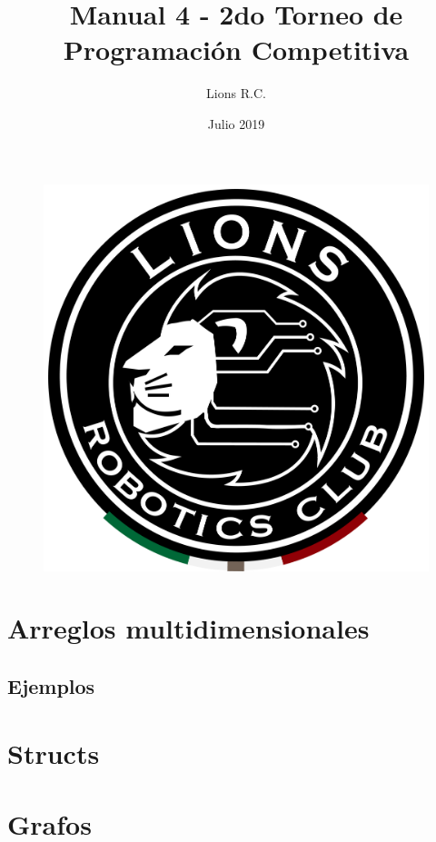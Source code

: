 \documentclass{article}
\title{Manual 4 - 2do Torneo de Programación Competitiva}
\author{Lions R.C.}
\date{Julio 2019}
\begin{document}
\maketitle

\tableofcontents

\begin{figure}[H]
    \centering
    \includegraphics[width=0.2\paperwidth]{newblack}
\end{figure}

\section{Arreglos multidimensionales}

\subsection{Ejemplos}

\section{Structs}

\section{Grafos}
\end{document}
